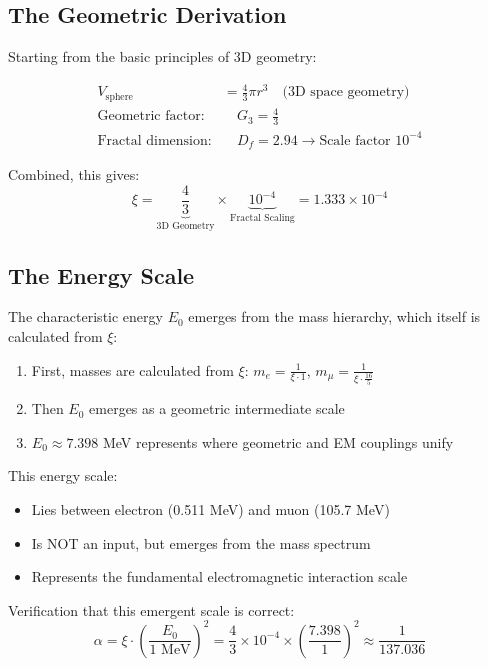 \documentclass[12pt,a4paper]{article}
\theoremstyle{definition}
\begin{document}
	\subsection{The Geometric Derivation}
	
	Starting from the basic principles of 3D geometry:
	
	\begin{align}
		V_{\text{sphere}} &= \frac{4}{3}\pi r^3 \quad \text{(3D space geometry)}\\
		\text{Geometric factor:} & \quad G_3 = \frac{4}{3}\\
		\text{Fractal dimension:} & \quad D_f = 2.94 \rightarrow \text{Scale factor } 10^{-4}
	\end{align}
	
	Combined, this gives:
	\begin{equation}
		\xi = \underbrace{\frac{4}{3}}_{\text{3D Geometry}} \times \underbrace{10^{-4}}_{\text{Fractal Scaling}} = 1.333 \times 10^{-4}
	\end{equation}
	
	\subsection{The Energy Scale}
	
	The characteristic energy $E_0$ emerges from the mass hierarchy, which itself is calculated from $\xi$:
	
	\begin{enumerate}
		\item First, masses are calculated from $\xi$: $m_e = \frac{1}{\xi \cdot 1}$, $m_\mu = \frac{1}{\xi \cdot \frac{16}{5}}$
		\item Then $E_0$ emerges as a geometric intermediate scale
		\item $E_0 \approx 7.398$ MeV represents where geometric and EM couplings unify
	\end{enumerate}
	
	This energy scale:
	\begin{itemize}
		\item Lies between electron (0.511 MeV) and muon (105.7 MeV)
		\item Is NOT an input, but emerges from the mass spectrum
		\item Represents the fundamental electromagnetic interaction scale
	\end{itemize}
	
	Verification that this emergent scale is correct:
	\begin{equation}
		\alpha = \xi \cdot \left(\frac{E_0}{1 \text{ MeV}}\right)^2 = \frac{4}{3} \times 10^{-4} \times \left(\frac{7.398}{1}\right)^2 \approx \frac{1}{137.036}
	\end{equation}
	
\end{document}
